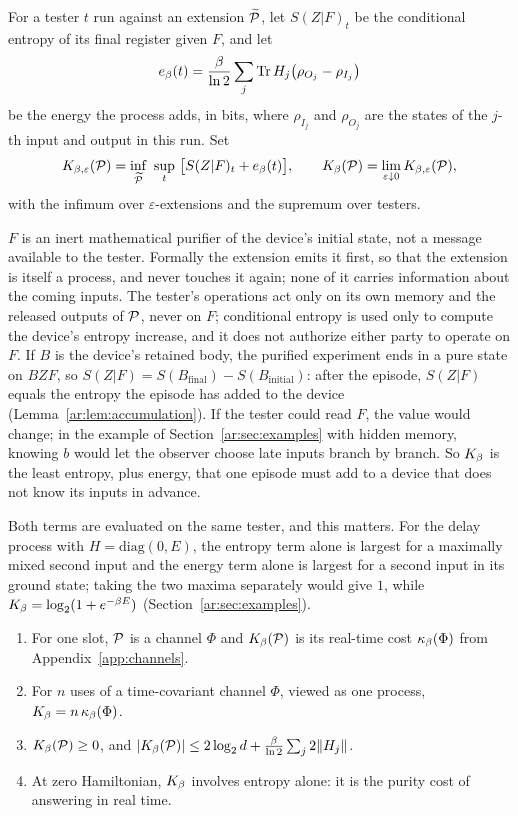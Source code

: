 \begin{definition}\label{ar:def:cost}
For a tester $t$ run against an extension $\widetilde{\mathcal P}$, let $S(Z|F)_t$ be the conditional entropy of its final register given $F$, and let
\[
e_\beta(t)=\frac{\beta}{\ln2}\sum_j\operatorname{Tr} H_j\bigl(\rho_{O_j}-\rho_{I_j}\bigr)
\]
be the energy the process adds, in bits, where $\rho_{I_j}$ and $\rho_{O_j}$ are the states of the $j$-th input and output in this run. Set
\[
K_{\beta,\varepsilon}(\Pp)=\inf_{\Pt}\ \sup_t\ \bigl[S(Z|F)_t+e_\beta(t)\bigr],\qquad \Kb(\Pp)=\lim_{\varepsilon\downarrow0}K_{\beta,\varepsilon}(\Pp),
\]
with the infimum over $\varepsilon$-extensions and the supremum over testers.
\end{definition}

$F$ is an inert mathematical purifier of the device's initial state, not a message available to the tester. Formally the extension emits it first, so that the extension is itself a process, and never touches it again; none of it carries information about the coming inputs. The tester's operations act only on its own memory and the released outputs of $\mathcal P$, never on $F$; conditional entropy is used only to compute the device's entropy increase, and it does not authorize either party to operate on $F$. If $B$ is the device's retained body, the purified experiment ends in a pure state on $BZF$, so $S(Z|F)=S(B_{\mathrm{final}})-S(B_{\mathrm{initial}})$: after the episode, $S(Z|F)$ equals the entropy the episode has added to the device (Lemma~\ref{ar:lem:accumulation}). If the tester could read $F$, the value would change; in the example of Section~\ref{ar:sec:examples} with hidden memory, knowing $b$ would let the observer choose late inputs branch by branch. So $K_\beta$ is the least entropy, plus energy, that one episode must add to a device that does not know its inputs in advance.

Both terms are evaluated on the same tester, and this matters. For the delay process with $H=\mathrm{diag}(0,E)$, the entropy term alone is largest for a maximally mixed second input and the energy term alone is largest for a second input in its ground state; taking the two maxima separately would give $1$, while $K_\beta=\log_2(1+e^{-\beta E})$ (Section~\ref{ar:sec:examples}).

\begin{proposition}\label{ar:prop:basic}
\begin{enumerate}[label=(\alph*)]
\item For one slot, $\mathcal P$ is a channel $\Phi$ and $K_\beta(\mathcal P)$ is its real-time cost $\kappa_\beta(\Phi)$ from Appendix~\ref{app:channels}.
\item For $n$ uses of a time-covariant channel $\Phi$, viewed as one process, $K_\beta=n\,\kappa_\beta(\Phi)$.
\item $K_\beta(\mathcal P)\ge0$, and $|K_\beta(\mathcal P)|\le2\log_2d+\frac{\beta}{\ln2}\sum_j2\|H_j\|$.
\item At zero Hamiltonian, $K_\beta$ involves entropy alone: it is the purity cost of answering in real time.
\end{enumerate}
\end{proposition}

